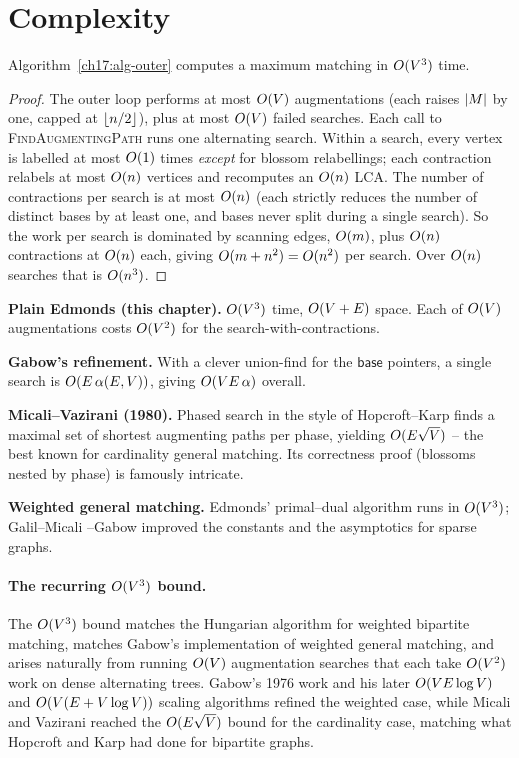 \section{Complexity}

\begin{theorem}
\label{ch17:thm-cubic}
Algorithm~\ref{ch17:alg-outer} computes a maximum matching in $O(V^3)$ time.
\end{theorem}

\begin{proof}
The outer loop performs at most $O(V)$ augmentations (each raises $\lvert M\rvert$ by one, capped at
$\lfloor n/2\rfloor$), plus at most $O(V)$ failed searches. Each call to \textsc{FindAugmentingPath} runs
one alternating search. Within a search, every vertex is labelled at most $O(1)$ times \emph{except}
for blossom relabellings; each contraction relabels at most $O(n)$ vertices and recomputes an
$O(n)$ LCA. The number of contractions per search is at most $O(n)$ (each strictly reduces the
number of distinct bases by at least one, and bases never split during a single search). So the work
per search is dominated by scanning edges, $O(m)$, plus $O(n)$ contractions at $O(n)$ each,
giving $O(m+n^2)=O(n^2)$ per search. Over $O(n)$ searches that is $O(n^3)$.
\end{proof}

\begin{complexitybox}
\textbf{Plain Edmonds (this chapter).} $O(V^3)$ time, $O(V+E)$ space. Each of $O(V)$
augmentations costs $O(V^2)$ for the search-with-contractions.

\textbf{Gabow's refinement.} With a clever union-find for the $\textsf{base}$ pointers, a single
search is $O(E\,\alpha(E,V))$, giving $O(VE\,\alpha)$ overall.

\textbf{Micali--Vazirani (1980).} Phased search in the style of Hopcroft--Karp finds a maximal set of
shortest augmenting paths per phase, yielding $O(E\sqrt{V})$ -- the best known for cardinality
general matching. Its correctness proof (blossoms nested by phase) is famously intricate.

\textbf{Weighted general matching.} Edmonds' primal--dual algorithm runs in $O(V^3)$; Galil--Micali
--Gabow improved the constants and the asymptotics for sparse graphs.
\end{complexitybox}

\paragraph{The recurring $O(V^3)$ bound.}
The $O(V^3)$ bound matches the Hungarian algorithm for
weighted bipartite matching, matches Gabow's implementation of weighted general matching,
and arises naturally from running $O(V)$ augmentation searches that each take $O(V^2)$ work on dense alternating trees. Gabow's 1976 work and his later $O(VE\log V)$ and
$O(V(E+V\log V))$ scaling algorithms refined the weighted case, while Micali and Vazirani reached the
$O(E\sqrt V)$ bound for the cardinality case, matching what Hopcroft and Karp had done for bipartite graphs.

